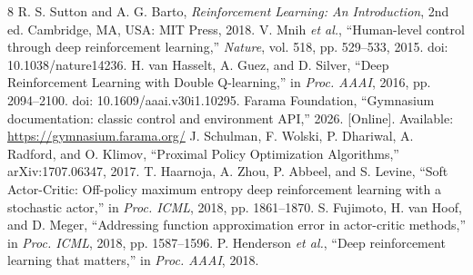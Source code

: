 \documentclass[conference,10pt]{IEEEtran}
\begin{document}
\begin{thebibliography}{8}
 R. S. Sutton and A. G. Barto, \emph{Reinforcement Learning: An Introduction}, 2nd ed. Cambridge, MA, USA: MIT Press, 2018.
 V. Mnih \emph{et al.}, ``Human-level control through deep reinforcement learning,'' \emph{Nature}, vol. 518, pp. 529--533, 2015. doi: 10.1038/nature14236.
 H. van Hasselt, A. Guez, and D. Silver, ``Deep Reinforcement Learning with Double Q-learning,'' in \emph{Proc. AAAI}, 2016, pp. 2094--2100. doi: 10.1609/aaai.v30i1.10295.
 Farama Foundation, ``Gymnasium documentation: classic control and environment API,'' 2026. [Online]. Available: \url{https://gymnasium.farama.org/}
 J. Schulman, F. Wolski, P. Dhariwal, A. Radford, and O. Klimov, ``Proximal Policy Optimization Algorithms,'' arXiv:1707.06347, 2017.
 T. Haarnoja, A. Zhou, P. Abbeel, and S. Levine, ``Soft Actor-Critic: Off-policy maximum entropy deep reinforcement learning with a stochastic actor,'' in \emph{Proc. ICML}, 2018, pp. 1861--1870.
 S. Fujimoto, H. van Hoof, and D. Meger, ``Addressing function approximation error in actor-critic methods,'' in \emph{Proc. ICML}, 2018, pp. 1587--1596.
 P. Henderson \emph{et al.}, ``Deep reinforcement learning that matters,'' in \emph{Proc. AAAI}, 2018.
\end{thebibliography}
\end{document}

